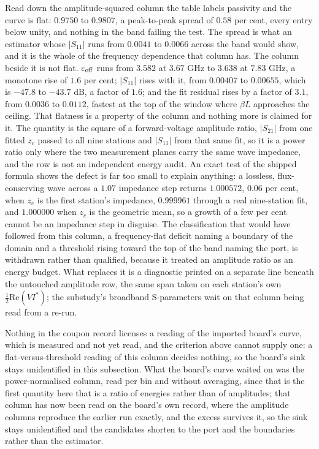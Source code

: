 Read down the amplitude-squared column the table labels passivity and the curve is flat: $0.9750$ to $0.9807$, a peak-to-peak spread of $0.58$ per
cent, every entry below unity, and nothing in the band failing the test. The spread is what an estimator whose
$|S_{11}|$ runs from $0.0041$ to $0.0066$ across the band would show, and it is the whole of the frequency
dependence that column has. The column beside it is not flat. $\varepsilon_{\mathrm{eff}}$ runs from $3.582$ at
$3.67$ GHz to $3.638$ at $7.83$ GHz, a monotone rise of $1.6$ per cent; $|S_{11}|$ rises with it, from $0.00407$
to $0.00655$, which is $-47.8$ to $-43.7$ dB, a factor of $1.6$; and the fit residual rises by a factor of $3.1$,
from $0.0036$ to $0.0112$, fastest at the top of the window where $\beta L$ approaches the ceiling. That flatness is a property of the column and nothing more is claimed for it. The quantity is the square of a forward-voltage amplitude ratio, $|S_{21}|$ from one fitted $z_c$ passed to all nine stations and $|S_{11}|$ from that same fit, so it is a power ratio only where the two measurement planes carry the same wave impedance, and the row is not an independent energy audit. An exact test of the shipped formula shows the defect is far too small to explain anything: a lossless, flux-conserving wave across a $1.07$ impedance step returns $1.000572$, $0.06$ per cent, when $z_c$ is the first station's impedance, $0.999961$ through a real nine-station fit, and $1.000000$ when $z_c$ is the geometric mean, so a growth of a few per cent cannot be an impedance step in disguise. The classification that would have followed from this column, a frequency-flat deficit naming a boundary of the domain and a threshold rising toward the top of the band naming the port, is withdrawn rather than qualified, because it treated an amplitude ratio as an energy budget. What replaces it is a diagnostic printed on a separate line beneath the untouched amplitude row, the same span taken on each station's own $\tfrac12\mathrm{Re}(V I^{*})$; the substudy's broadband S-parameters wait on that column being read from a re-run.

Nothing in the coupon record licenses a reading of the imported board's curve, which is measured and not yet read, and the criterion above cannot supply one: a flat-versus-threshold reading of this column decides nothing, so the board's sink stays unidentified in this subsection. What the board's curve waited on was the power-normalised column, read per bin and without averaging, since that is the first quantity here that is a ratio of energies rather than of amplitudes; that column has now been read on the board's own record, where the amplitude columns reproduce the earlier run exactly, and the excess survives it, so the sink stays unidentified and the candidates shorten to the port and the boundaries rather than the estimator.

